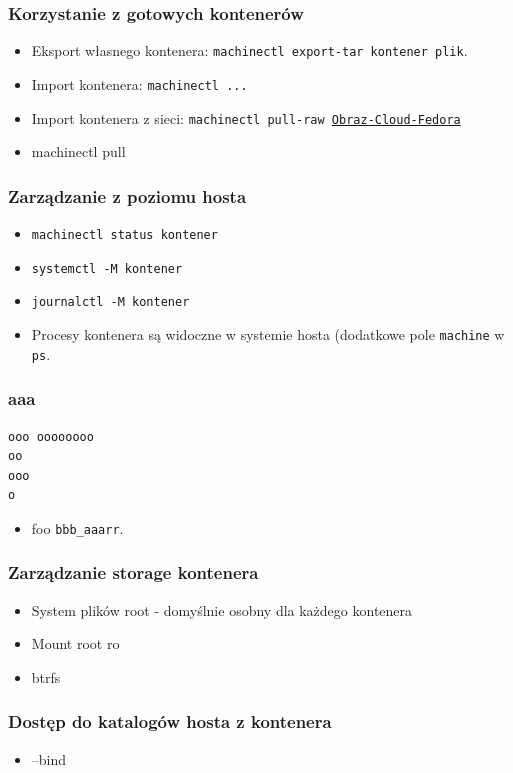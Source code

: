 \documentclass[dvipsnames,table]{beamer}
\begin{document}
\begin{frame}
\frametitle{Korzystanie z gotowych kontenerów}
\begin{itemize}
	\item Eksport własnego kontenera: {\tt machinectl export-tar kontener plik}.
	\item Import kontenera: {\tt machinectl ...}
	\item Import kontenera z sieci: {\tt machinectl pull-raw \href{https://dl.fedoraproject.org/pub/fedora/linux/releases/25/CloudImages/x86\_64/images/Fedora-Cloud-Base-25-1.3.x86\_64.raw.xz}{Obraz-Cloud-Fedora}}
	\item machinectl pull
\end{itemize}
\end{frame}


\begin{frame}
\frametitle{Zarządzanie z poziomu hosta}
\begin{itemize}
	\item {\tt machinectl status kontener}
	\item {\tt systemctl -M kontener}
	\item {\tt journalctl -M kontener}
	\item Procesy kontenera są widoczne w systemie hosta (dodatkowe pole {\tt machine} w {\tt ps}.
\end{itemize}
\end{frame}

\begin{frame}[fragile]
\frametitle{aaa}
\scriptsize
\begin{verbatim}
ooo oooooooo
oo
ooo
o
\end{verbatim}
\normalsize
\begin{itemize}
	\item foo {\tt bbb\_aaarr}.
\end{itemize}
\end{frame}

\begin{frame}
\frametitle{Zarządzanie storage kontenera}
\begin{itemize}
	\item System plików root - domyślnie osobny dla każdego kontenera
	\item Mount root ro
	\item btrfs
\end{itemize}
\end{frame}

\begin{frame}
\frametitle{Dostęp do katalogów hosta z kontenera}
\begin{itemize}
	\item --bind
\end{itemize}
\end{frame}
\end{document}
